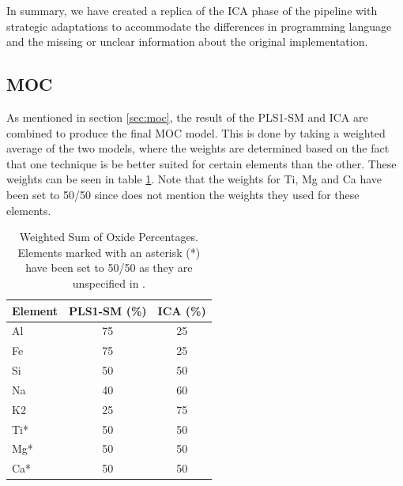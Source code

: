 In summary, we have created a replica of the ICA phase of the pipeline with strategic adaptations to accommodate the differences in programming language and the missing or unclear information about the original implementation.

\subsection{MOC}
As mentioned in section \ref{sec:moc}, the result of the PLS1-SM and ICA are combined to produce the final MOC model.
This is done by taking a weighted average of the two models, where the weights are determined based on the fact that one technique is be better suited for certain elements than the other.
These weights can be seen in table \ref{tab:weighted_sum_oxide}.
Note that the weights for Ti, Mg and Ca have been set to 50/50 since \citeauthor{cleggRecalibrationMarsScience2017} does not mention the weights they used for these elements.

\begin{table}[h]
\centering
\begin{tabular*}{\columnwidth}{@{\extracolsep{\fill}}lcc}
\toprule
Element  & PLS1-SM (\%) & ICA (\%) \\ \midrule
Al       & 75           & 25      \\
Fe       & 75           & 25      \\
Si       & 50           & 50      \\
Na       & 40           & 60      \\
K2       & 25           & 75      \\
Ti*      & 50           & 50      \\
Mg*      & 50           & 50      \\
Ca*      & 50           & 50      \\
\bottomrule
\end{tabular*}
\caption{Weighted Sum of Oxide Percentages. Elements marked with an asterisk (*) have been set to 50/50 as they are unspecified in \citeauthor{cleggRecalibrationMarsScience2017}.}
\label{tab:weighted_sum_oxide}
\end{table}






